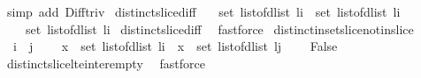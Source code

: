 \begin{isabellebody}
%
\isadelimproof
%
\endisadelimproof
%
\isatagproof
{}\isamarkupfalse%
\ {\isacharparenleft}simp\ add{\isacharcolon}\ Diff{\isacharunderscore}triv{\isacharparenright}%
\endisatagproof
{\isafoldproof}%
%
\isadelimproof
\isanewline
%
\endisadelimproof
\isanewline
{}\isamarkupfalse%
\ distinct{\isacharunderscore}slice{\isacharunderscore}diff{}{\isacharcolon}\ \isanewline
\ \ {\isachardoublequoteopen}set\ {\isacharparenleft}list{\isacharunderscore}of{\isacharunderscore}dlist\ {\isacharparenleft}l{\isasymdagger}i{\isachardot}{\isachardot}{\isacharparenright}{\isacharparenright}\ {\isacharminus}\ set\ {\isacharparenleft}list{\isacharunderscore}of{\isacharunderscore}dlist\ {\isacharparenleft}l{\isasymdagger}{\isachardot}{\isachardot}i{\isacharparenright}{\isacharparenright}\ {\isacharequal}\ \isanewline
\ \ \ \ set\ {\isacharparenleft}list{\isacharunderscore}of{\isacharunderscore}dlist\ {\isacharparenleft}l{\isasymdagger}i{\isachardot}{\isachardot}{\isacharparenright}{\isacharparenright}{\isachardoublequoteclose}\isanewline
%
\isadelimproof
%
\endisadelimproof
%
\isatagproof
{}\isamarkupfalse%
\ distinct{\isacharunderscore}slice{\isacharunderscore}diff{}\ \isamarkupfalse%
\ fastforce%
\endisatagproof
{\isafoldproof}%
%
\isadelimproof
\isanewline
%
\endisadelimproof
\isanewline
\isanewline
\isanewline
{}\isamarkupfalse%
\ distinct{\isacharunderscore}in{\isacharunderscore}set{\isacharunderscore}slice{}{\isacharunderscore}not{\isacharunderscore}in{\isacharunderscore}slice{}{\isacharcolon}\ \isanewline
\ \ {\isachardoublequoteopen}i\ {\isasymle}\ j\ {\isasymLongrightarrow}\ \isanewline
\ \ x\ {\isasymin}\ set\ {\isacharparenleft}list{\isacharunderscore}of{\isacharunderscore}dlist\ {\isacharparenleft}l{\isasymdagger}{\isachardot}{\isachardot}i{\isacharparenright}{\isacharparenright}\ {\isasymand}\ x\ {\isasymin}\ set\ {\isacharparenleft}list{\isacharunderscore}of{\isacharunderscore}dlist\ {\isacharparenleft}l{\isasymdagger}j{\isachardot}{\isachardot}{\isacharparenright}{\isacharparenright}\ {\isasymLongrightarrow}\ \isanewline
\ \ False{\isachardoublequoteclose}\isanewline
%
\isadelimproof
%
\endisadelimproof
%
\isatagproof
{}\isamarkupfalse%
\ distinct{\isacharunderscore}slice{\isacharunderscore}lte{\isacharunderscore}inter{\isacharunderscore}empty\ \isamarkupfalse%
\ fastforce%
\endisatagproof
{\isafoldproof}%
%
\isadelimproof
\isanewline
%
\endisadelimproof
\isanewline
{}\isamarkupfalse%

\end{isabellebody}
